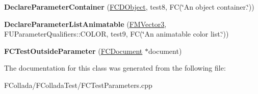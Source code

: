 \begin{DoxyCompactItemize}
\item 
\hypertarget{classFCTestOutsideParameter_ad9199ff6eb59419eacd0b0b51b087ba8}{
{\bfseries DeclareParameterContainer} (\hyperlink{classFCDObject}{FCDObject}, test8, FC(\char`\"{}An object container.\char`\"{}))}
\label{classFCTestOutsideParameter_ad9199ff6eb59419eacd0b0b51b087ba8}

\item 
\hypertarget{classFCTestOutsideParameter_ad98034ffee8e58bc323bbf95fbc5a4cd}{
{\bfseries DeclareParameterListAnimatable} (\hyperlink{classFMVector3}{FMVector3}, FUParameterQualifiers::COLOR, test9, FC(\char`\"{}An animatable color list.\char`\"{}))}
\label{classFCTestOutsideParameter_ad98034ffee8e58bc323bbf95fbc5a4cd}

\item 
\hypertarget{classFCTestOutsideParameter_a65cecff86b0a1756c1cee20567cbc00a}{
{\bfseries FCTestOutsideParameter} (\hyperlink{classFCDocument}{FCDocument} $\ast$document)}
\label{classFCTestOutsideParameter_a65cecff86b0a1756c1cee20567cbc00a}

\end{DoxyCompactItemize}


The documentation for this class was generated from the following file:\begin{DoxyCompactItemize}
\item 
FCollada/FColladaTest/FCTestParameters.cpp\end{DoxyCompactItemize}

